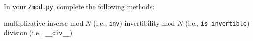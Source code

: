   In your \verb!Zmod.py!, complete the following methods:
  \begin{enumerate}[nosep]
    \li multiplicative inverse mod $N$ (i.e., \texttt{inv})
    \li invertibility mod $N$ (i.e., \texttt{is\_invertible})
    \li division (i.e., \texttt{\_\_div\_\_})
  \end{enumerate}

